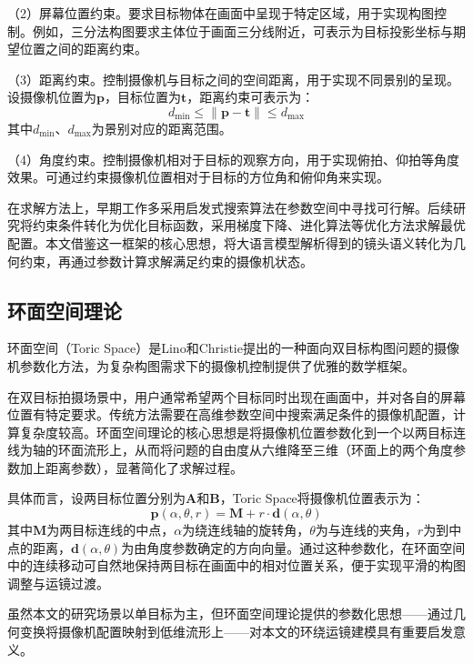 （2）屏幕位置约束。要求目标物体在画面中呈现于特定区域，用于实现构图控制。例如，三分法构图要求主体位于画面三分线附近，可表示为目标投影坐标与期望位置之间的距离约束。

（3）距离约束。控制摄像机与目标之间的空间距离，用于实现不同景别的呈现。设摄像机位置为$\mathbf{p}$，目标位置为$\mathbf{t}$，距离约束可表示为：
\begin{equation}
d_{\min} \leq \|\mathbf{p} - \mathbf{t}\| \leq d_{\max}
\end{equation}
其中$d_{\min}$、$d_{\max}$为景别对应的距离范围。

（4）角度约束。控制摄像机相对于目标的观察方向，用于实现俯拍、仰拍等角度效果。可通过约束摄像机位置相对于目标的方位角和俯仰角来实现。

在求解方法上，早期工作多采用启发式搜索算法在参数空间中寻找可行解\cite{gleicher1992through}。后续研究将约束条件转化为优化目标函数，采用梯度下降、进化算法等优化方法求解最优配置\cite{lino2015intuitive,jiang2020optimizing}。本文借鉴这一框架的核心思想，将大语言模型解析得到的镜头语义转化为几何约束，再通过参数计算求解满足约束的摄像机状态。

\subsection{环面空间理论}

环面空间（Toric Space）是Lino和Christie\cite{lino2015intuitive}提出的一种面向双目标构图问题的摄像机参数化方法，为复杂构图需求下的摄像机控制提供了优雅的数学框架。

在双目标拍摄场景中，用户通常希望两个目标同时出现在画面中，并对各自的屏幕位置有特定要求。传统方法需要在高维参数空间中搜索满足条件的摄像机配置，计算复杂度较高。环面空间理论的核心思想是将摄像机位置参数化到一个以两目标连线为轴的环面流形上，从而将问题的自由度从六维降至三维（环面上的两个角度参数加上距离参数），显著简化了求解过程。

具体而言，设两目标位置分别为$\mathbf{A}$和$\mathbf{B}$，Toric Space将摄像机位置表示为：
\begin{equation}
\mathbf{p}(\alpha, \theta, r) = \mathbf{M} + r \cdot \mathbf{d}(\alpha, \theta)
\end{equation}
其中$\mathbf{M}$为两目标连线的中点，$\alpha$为绕连线轴的旋转角，$\theta$为与连线的夹角，$r$为到中点的距离，$\mathbf{d}(\alpha, \theta)$为由角度参数确定的方向向量。通过这种参数化，在环面空间中的连续移动可自然地保持两目标在画面中的相对位置关系，便于实现平滑的构图调整与运镜过渡。

虽然本文的研究场景以单目标为主，但环面空间理论提供的参数化思想——通过几何变换将摄像机配置映射到低维流形上——对本文的环绕运镜建模具有重要启发意义。


